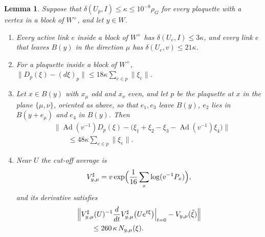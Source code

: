 \documentclass[11pt]{amsart}
\newtheorem{lemma}[theorem]{Lemma}
\theoremstyle{definition}
\theoremstyle{remark}
\numberwithin{equation}{section}
\begin{document}
\begin{lemma}\label{lem:smallframes}
Suppose that $\delta(U_p,I)\le\kappa\le10^{-8}\rho_G$ for every plaquette
with a vertex in a block of $W^+$, and let $y\in W$.
\begin{enumerate}[label=\textup{(\roman*)},leftmargin=*]
\item Every active link $e$ inside a block of $W^+$ has $\delta(U_e,I)\le
3\kappa$, and every link $e$ that leaves $B(y)$ in the direction $\mu$ has
$\delta(U_e,v)\le21\kappa$.
\item For a plaquette inside a block of $W^+$, $\lVert D_p(\xi)-(d\xi)_p
\rVert\le18\kappa\sum_{e\in p}\lVert\xi_e\rVert$.
\item Let $x\in B(y)$ with $x_\mu$ odd and $x_\nu$ even, and let $p$ be the
plaquette at $x$ in the plane $\{\mu,\nu\}$, oriented as above, so that
$e_1,e_3$ leave $B(y)$, $e_2$ lies in $B(y+e_\mu)$ and $e_4$ in $B(y)$. Then
\[
\begin{split}
&\bigl\lVert\operatorname{Ad}(v^{-1})D_p(\xi)-\bigl(\xi_1+\xi_2-\xi_3-
\operatorname{Ad}(v^{-1})\xi_4\bigr)\bigr\rVert\\
&\qquad\le48\kappa\sum_{e\in p}\lVert\xi_e\rVert.
\end{split}
\]
\item Near $U$ the cut-off average is
\[
V^\sharp_{y,\mu}=v\exp\Bigl(\frac1{16}\sum_x\log(v^{-1}P_x)\Bigr),
\]
and its derivative satisfies
\[
\begin{split}
&\Bigl\lVert V^\sharp_{y,\mu}(U)^{-1}\frac d{dt}V^\sharp_{y,\mu}\bigl(Ue^{t
\xi}\bigr)\Big|_{t=0}-V_{y,\mu}(\tilde\xi)\Bigr\rVert\\
&\qquad\le260\,\kappa\,N_{y,\mu}(\xi).
\end{split}
\]
\end{enumerate}
\end{lemma}
\end{document}
